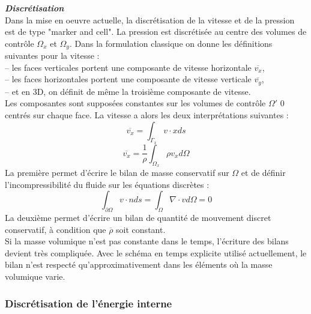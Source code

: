 \textit{\textbf{Discr\'etisation}}\smallskip \\

Dans la mise en oeuvre actuelle, la discr\'etisation de la vitesse et de la pression est de type "marker and cell". La pression est discr\'etis\'ee au centre des volumes de contrôle $\Omega_{x}$ et $\Omega_{y}$. Dans la formulation classique on donne les d\'efinitions suivantes pour la vitesse :\\
– les faces verticales portent une composante de vitesse horizontale $\overline{v_{x}}$,\\
– les faces horizontales portent une composante de vitesse verticale $\overline{v_{y}}$,\\
– et en 3D, on d\'efinit de même la troisi\`eme composante de vitesse.\\
Les composantes sont suppos\'ees constantes sur les volumes de contr\^ole $\Omega'$ 0 centr\'es sur chaque face. La vitesse a alors les deux interpr\'etations suivantes :
\begin{equation}
\overline{v_{x}} = \int_{\Gamma_{x}} v \cdot x ds
\end{equation}
\begin{equation}
\overline{v_{x}} = \dfrac{1}{\rho} \int_{\Omega_{x}} \rho v_{x} d\Omega
\end{equation}
La premi\`ere permet d’\'ecrire le bilan de masse conservatif sur $\Omega$ et de d\'efinir l’incompressibilit\'e du fluide sur les \'equations discr\`etes :
\begin{equation}
\int_{\partial\Omega} v \cdot n ds = \int_{\Omega} \nabla \cdot v d\Omega = 0
\end{equation}
La deuxi\`eme permet d’\'ecrire un bilan de quantit\'e de mouvement discret conservatif, \`a condition que $\overline{\rho}$ soit constant.\\
Si la masse volumique n’est pas constante dans le temps, l’\'ecriture des bilans
devient très compliqu\'ee. Avec le sch\'ema en temps explicite utilis\'e actuellement, le bilan n’est respect\'e qu’approximativement dans les \'el\'ements o\`u la masse volumique varie.

\subsubsection{Discr\'etisation de l’\'energie interne}

